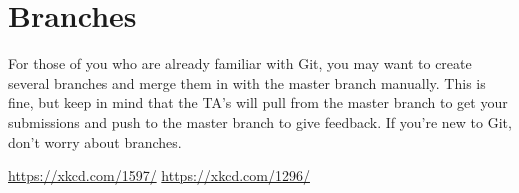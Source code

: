 \begin{comment}
\section*{Lab Submission and File Organization} %

Since the repositories for each class are entirely separate, we will use the convention repository / lab\# / solutions.py.
As long as we set up the repositories correctly online, the repository folder on your machine can be called whatever you want.

Git is designed to store source code files, not large data files.
When a lab uses a large data set, download the data and put it in your repository folder, but do not add/commit the data file.
That way, you can use the data without pushing it up to the cloud.

Please do not submit anything other than the source code needed to run your solutions.
No file you submit should ever execute any code in its main body.
The only things you should include in the main body of the file are import statements, function declarations, and class declarations.
Anything else (tests, etc.) should be placed in an \li{if __name__ == "__main__":} block at the end of the file so that it is not executed when we import the file for grading.
\end{comment}

\section*{Branches} %

For those of you who are already familiar with Git, you may want to create several branches and merge them in with the master branch manually. This is fine, but keep in mind that the TA's will pull from the master branch to get your submissions and push to the master branch to give feedback. If you're new to Git, don't worry about branches.

\url{https://xkcd.com/1597/}
\url{https://xkcd.com/1296/}
